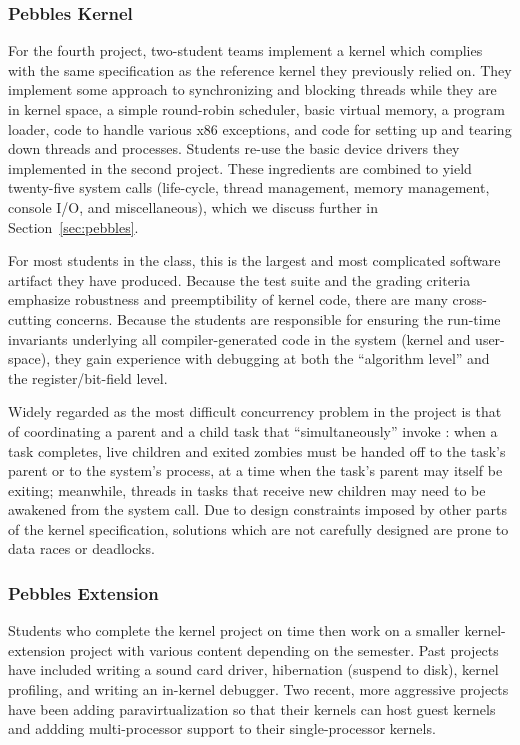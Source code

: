 \subsubsection{Pebbles Kernel}
For the fourth project, two-student teams
implement a kernel which complies with the
same specification as the reference kernel
they previously relied on.
They implement some approach to
synchronizing and blocking threads while
they are in kernel space,
a simple round-robin scheduler,
basic virtual memory,
a program loader,
code to handle various x86 exceptions,
and code for setting up and tearing down
threads and processes.
Students re-use the basic device drivers
they implemented in the second project.
These ingredients are combined to yield
twenty-five system calls
(life-cycle, thread management, memory management,
console I/O, and miscellaneous),
which we discuss further in Section~\ref{sec:pebbles}.

For most students in the class, this is the
largest and most complicated software artifact they
have produced.
Because the test suite and the grading criteria
emphasize robustness and preemptibility of
kernel code,
there are many cross-cutting concerns.
%
Because the students are responsible for ensuring
the run-time invariants underlying all compiler-generated
code in the system (kernel and user-space),
they gain experience with debugging at both the
``algorithm level'' and the register/bit-field level.

Widely regarded as the most difficult concurrency problem in the project
is that of coordinating a parent and a child task that ``simultaneously''
invoke :
when a task completes,
live children and exited zombies must be handed off
to the task's parent or to the system's  process,
at a time when the task's parent may itself be
exiting;
meanwhile, threads in tasks that receive new children
may need to be awakened from the  system call.
Due to design constraints imposed by other parts of the kernel specification,
solutions which are not carefully designed
are prone to data races or deadlocks.

\subsubsection{Pebbles Extension}
Students who complete the kernel project on time
then work on a smaller kernel-extension project
with various content depending on the semester.
Past projects have included
writing a sound card driver,
hibernation (suspend to disk),
kernel profiling,
and writing an in-kernel debugger.
Two recent, more aggressive projects have been
adding paravirtualization so that their kernels
can host guest kernels and
addding multi-processor support to their single-processor kernels.

